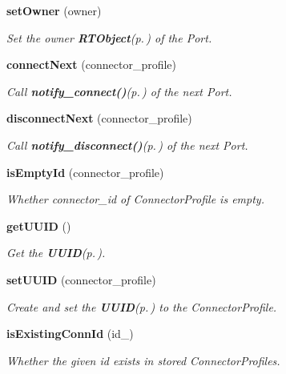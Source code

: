 \begin{CompactItemize}
{\bf set\-Owner} (owner)
\begin{CompactList}\small\item\em Set the owner {\bf RTObject}{\rm (p.\,\pageref{namespaceRTObject})} of the Port. \item\end{CompactList}\item 
{\bf connect\-Next} (connector\_\-profile)
\begin{CompactList}\small\item\em Call {\bf notify\_\-connect()}{\rm (p.\,\pageref{classPortBase_PortBasea6})} of the next Port. \item\end{CompactList}\item 
{\bf disconnect\-Next} (connector\_\-profile)
\begin{CompactList}\small\item\em Call {\bf notify\_\-disconnect()}{\rm (p.\,\pageref{classPortBase_PortBasea8})} of the next Port. \item\end{CompactList}\item 
{\bf is\-Empty\-Id} (connector\_\-profile)
\begin{CompactList}\small\item\em Whether connector\_\-id of Connector\-Profile is empty. \item\end{CompactList}\item 
{\bf get\-UUID} ()
\begin{CompactList}\small\item\em Get the {\bf UUID}{\rm (p.\,\pageref{classUUID})}. \item\end{CompactList}\item 
{\bf set\-UUID} (connector\_\-profile)
\begin{CompactList}\small\item\em Create and set the {\bf UUID}{\rm (p.\,\pageref{classUUID})} to the Connector\-Profile. \item\end{CompactList}\item 
{\bf is\-Existing\-Conn\-Id} (id\_\-)
\begin{CompactList}\small\item\em Whether the given id exists in stored Connector\-Profiles. \item\end{CompactList}\item 

\end{CompactItemize}
